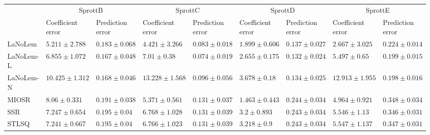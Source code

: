 \begin{table*}
{\begin{tabular}{lllllllll}
 & \multicolumn{2}{c}{SprottB} & \multicolumn{2}{c}{SprottC} & \multicolumn{2}{c}{SprottD} & \multicolumn{2}{c}{SprottE} \\
 & Coefficient error & Prediction error & Coefficient error & Prediction error & Coefficient error & Prediction error & Coefficient error & Prediction error \\
\midrule
LaNoLem & $\mathbf{5.211}\pm 2.788$ & $0.183\pm 0.068$ & $\mathbf{4.421}\pm 3.266$ & $0.083\pm 0.018$ & $1.899\pm 0.606$ & $0.137\pm 0.027$ & $\mathbf{2.667}\pm 3.025$ & $0.224\pm 0.014$ \\
LaNoLem-L & $6.855\pm 1.072$ & $\mathbf{0.167}\pm 0.048$ & $7.01\pm 0.38$ & $\mathbf{0.074}\pm 0.019$ & $2.655\pm 0.175$ & $\mathbf{0.132}\pm 0.024$ & $5.497\pm 0.65$ & $0.199\pm 0.015$ \\
LaNoLem-N & $10.425\pm 1.312$ & $0.168\pm 0.046$ & $13.228\pm 1.568$ & $0.096\pm 0.056$ & $3.678\pm 0.18$ & $0.134\pm 0.025$ & $12.913\pm 1.955$ & $\mathbf{0.198}\pm 0.016$ \\
MIOSR & $8.06\pm 0.331$ & $0.191\pm 0.038$ & $5.371\pm 0.561$ & $0.131\pm 0.037$ & $\mathbf{1.463}\pm 0.443$ & $0.244\pm 0.034$ & $4.964\pm 0.921$ & $0.348\pm 0.034$ \\
SSR & $7.247\pm 0.654$ & $0.195\pm 0.04$ & $6.768\pm 1.028$ & $0.131\pm 0.039$ & $3.2\pm 0.893$ & $0.243\pm 0.034$ & $5.546\pm 1.13$ & $0.346\pm 0.031$ \\
STLSQ & $7.241\pm 0.667$ & $0.195\pm 0.04$ & $6.766\pm 1.023$ & $0.131\pm 0.039$ & $3.218\pm 0.9$ & $0.243\pm 0.034$ & $5.547\pm 1.137$ & $0.347\pm 0.031$ \\

\midrule


\end{tabular}}
\end{table*}

